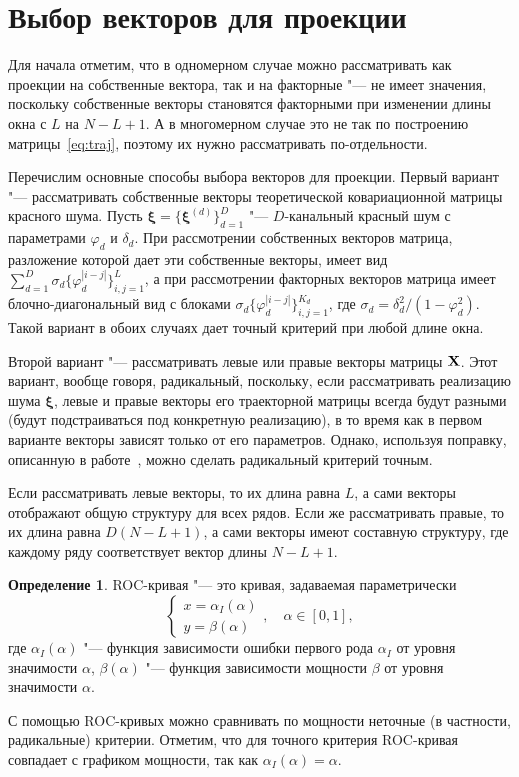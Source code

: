 \documentclass[specialist,
substylefile = spbu_report.rtx,
subf,href,colorlinks=true, 12pt]{disser}
\theoremstyle{definition}
\newtheorem{definition}{Определение}
\newcommand{\bfxi}{\boldsymbol{\xi}}
\begin{document}
	\section{Выбор векторов для проекции}
	Для начала отметим, что в одномерном случае можно рассматривать как проекции на собственные вектора, так и на факторные  "--- не имеет значения, поскольку собственные векторы становятся факторными при изменении длины окна с $L$ на $N-L+1$. А в многомерном случае это не так по построению матрицы~\eqref{eq:traj}, поэтому их нужно рассматривать по-отдельности.
	
	Перечислим основные способы выбора векторов для проекции. Первый вариант "--- рассматривать собственные векторы теоретической ковариационной матрицы красного шума. Пусть $\bfxi=\{\bfxi^{(d)}\}_{d=1}^D$ "--- $D$-канальный красный шум с параметрами $\varphi_d$ и $\delta_d$.  При рассмотрении собственных векторов матрица, разложение которой дает эти собственные векторы, имеет вид $\sum_{d=1}^D\sigma_d\{\varphi_d^{|i-j|}\}_{i,j=1}^{L}$, а при рассмотрении факторных векторов матрица имеет блочно-диагональный вид с блоками $\sigma_d\{\varphi_d^{|i-j|}\}_{i,j=1}^{K_d}$, где $\sigma_d=\delta_d^2/(1-\varphi_d^2)$. Такой вариант в обоих случаях дает точный критерий при любой длине окна. 
	
	Второй вариант "--- рассматривать левые или правые векторы матрицы $\mathbf{X}$. Этот вариант, вообще говоря, радикальный, поскольку, если рассматривать реализацию шума $\bfxi$, левые и правые векторы его траекторной матрицы всегда будут разными (будут подстраиваться под конкретную реализацию), в то время как в первом варианте векторы зависят только от его параметров. Однако, используя поправку, описанную в работе~\cite{Larin_2022}, можно сделать радикальный критерий точным.
	
  
	Если рассматривать левые векторы, то их длина равна $L$, а сами векторы отображают общую структуру для всех рядов. Если же рассматривать правые, то их длина равна $D(N-L+1)$, а сами векторы имеют составную структуру, где каждому ряду соответствует вектор длины $N-L+1$.
	
	\begin{definition}
		ROC-кривая "--- это кривая, задаваемая параметрически
		\[
		\begin{cases}
		x=\alpha_I(\alpha)\\
		y=\beta(\alpha)
		\end{cases},\quad \alpha\in[0,1],
		\]
		где $\alpha_I(\alpha)$ "--- функция зависимости ошибки первого рода $\alpha_I$ от уровня значимости $\alpha$, $\beta(\alpha)$ "--- функция зависимости мощности $\beta$ от уровня значимости $\alpha$.
	\end{definition}
	С помощью ROC-кривых можно сравнивать по мощности неточные (в частности, радикальные) критерии. Отметим, что для точного критерия ROC-кривая совпадает с графиком мощности, так как $\alpha_I(\alpha)=\alpha$.
\end{document}
